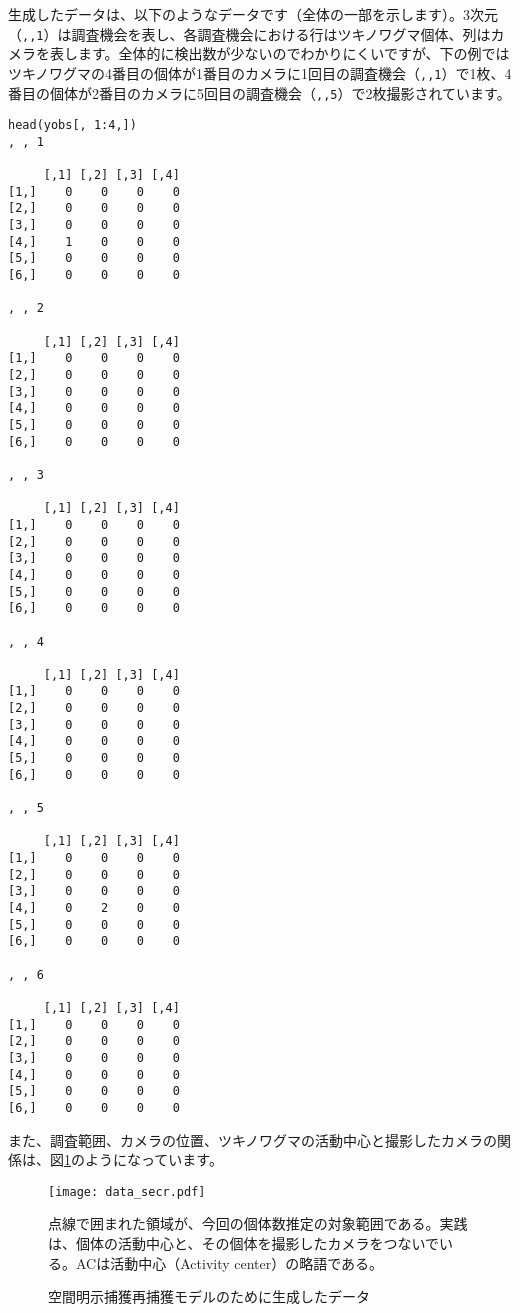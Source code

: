 生成したデータは、以下のようなデータです（全体の一部を示します）。3次元（\verb|,,1|）は調査機会を表し、各調査機会における行はツキノワグマ個体、列はカメラを表します。全体的に検出数が少ないのでわかりにくいですが、下の例ではツキノワグマの4番目の個体が1番目のカメラに1回目の調査機会（\verb|,,1|）で1枚、4番目の個体が2番目のカメラに5回目の調査機会（\verb|,,5|）で2枚撮影されています。
\begin{verbatim}
head(yobs[, 1:4,])
, , 1

     [,1] [,2] [,3] [,4]
[1,]    0    0    0    0
[2,]    0    0    0    0
[3,]    0    0    0    0
[4,]    1    0    0    0
[5,]    0    0    0    0
[6,]    0    0    0    0

, , 2

     [,1] [,2] [,3] [,4]
[1,]    0    0    0    0
[2,]    0    0    0    0
[3,]    0    0    0    0
[4,]    0    0    0    0
[5,]    0    0    0    0
[6,]    0    0    0    0

, , 3

     [,1] [,2] [,3] [,4]
[1,]    0    0    0    0
[2,]    0    0    0    0
[3,]    0    0    0    0
[4,]    0    0    0    0
[5,]    0    0    0    0
[6,]    0    0    0    0

, , 4

     [,1] [,2] [,3] [,4]
[1,]    0    0    0    0
[2,]    0    0    0    0
[3,]    0    0    0    0
[4,]    0    0    0    0
[5,]    0    0    0    0
[6,]    0    0    0    0

, , 5

     [,1] [,2] [,3] [,4]
[1,]    0    0    0    0
[2,]    0    0    0    0
[3,]    0    0    0    0
[4,]    0    2    0    0
[5,]    0    0    0    0
[6,]    0    0    0    0

, , 6

     [,1] [,2] [,3] [,4]
[1,]    0    0    0    0
[2,]    0    0    0    0
[3,]    0    0    0    0
[4,]    0    0    0    0
[5,]    0    0    0    0
[6,]    0    0    0    0
\end{verbatim}
また、調査範囲、カメラの位置、ツキノワグマの活動中心と撮影したカメラの関係は、図\ref{data_secr}のようになっています。
\begin{figure}[htb]
\begin{center}
\graphicspath{{4_hm/figs/}}
\texttt{[image: data\_secr.pdf]}\\
\caption{空間明示捕獲再捕獲モデルのために生成したデータ}
\label{data_secr}
\begin{flushleft}
\scriptsize 点線で囲まれた領域が、今回の個体数推定の対象範囲である。実践は、個体の活動中心と、その個体を撮影したカメラをつないでいる。ACは活動中心（Activity center）の略語である。
\end{flushleft}
\end{center}
\end{figure}

